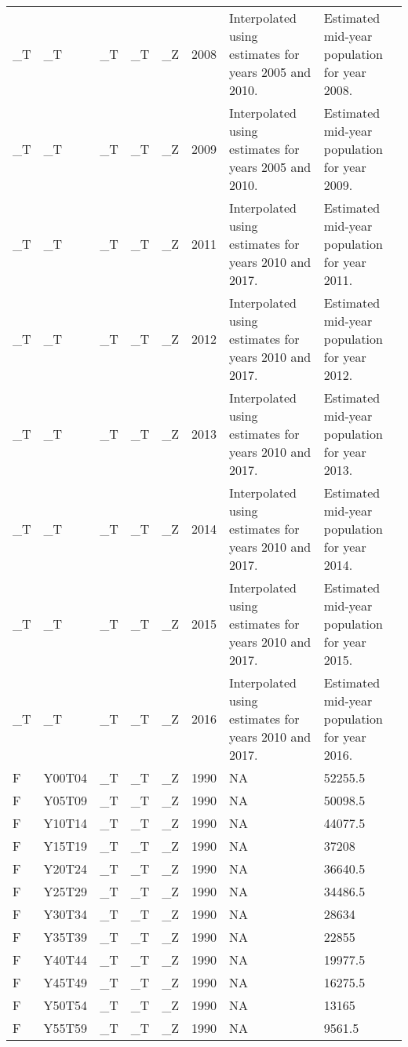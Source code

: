 \begin{longtable}[t]{llllllll}
\_T & \_T & \_T & \_T & \_Z & 2008 & Interpolated using estimates for years 2005 and 2010. & Estimated mid-year population for year 2008.\\
\_T & \_T & \_T & \_T & \_Z & 2009 & Interpolated using estimates for years 2005 and 2010. & Estimated mid-year population for year 2009.\\
\_T & \_T & \_T & \_T & \_Z & 2011 & Interpolated using estimates for years 2010 and 2017. & Estimated mid-year population for year 2011.\\
\addlinespace
\_T & \_T & \_T & \_T & \_Z & 2012 & Interpolated using estimates for years 2010 and 2017. & Estimated mid-year population for year 2012.\\
\_T & \_T & \_T & \_T & \_Z & 2013 & Interpolated using estimates for years 2010 and 2017. & Estimated mid-year population for year 2013.\\
\_T & \_T & \_T & \_T & \_Z & 2014 & Interpolated using estimates for years 2010 and 2017. & Estimated mid-year population for year 2014.\\
\_T & \_T & \_T & \_T & \_Z & 2015 & Interpolated using estimates for years 2010 and 2017. & Estimated mid-year population for year 2015.\\
\_T & \_T & \_T & \_T & \_Z & 2016 & Interpolated using estimates for years 2010 and 2017. & Estimated mid-year population for year 2016.\\
\addlinespace
F & Y00T04 & \_T & \_T & \_Z & 1990 & NA & 52255.5\\
F & Y05T09 & \_T & \_T & \_Z & 1990 & NA & 50098.5\\
F & Y10T14 & \_T & \_T & \_Z & 1990 & NA & 44077.5\\
F & Y15T19 & \_T & \_T & \_Z & 1990 & NA & 37208\\
F & Y20T24 & \_T & \_T & \_Z & 1990 & NA & 36640.5\\
\addlinespace
F & Y25T29 & \_T & \_T & \_Z & 1990 & NA & 34486.5\\
F & Y30T34 & \_T & \_T & \_Z & 1990 & NA & 28634\\
F & Y35T39 & \_T & \_T & \_Z & 1990 & NA & 22855\\
F & Y40T44 & \_T & \_T & \_Z & 1990 & NA & 19977.5\\
F & Y45T49 & \_T & \_T & \_Z & 1990 & NA & 16275.5\\
\addlinespace
F & Y50T54 & \_T & \_T & \_Z & 1990 & NA & 13165\\
F & Y55T59 & \_T & \_T & \_Z & 1990 & NA & 9561.5\\

\end{longtable}
